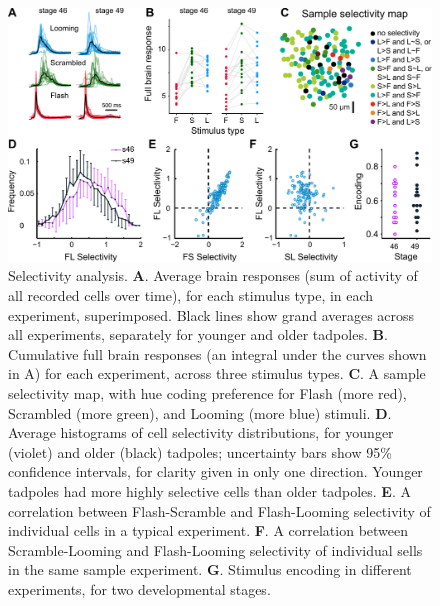\documentclass{article}
\begin{document}
\begin{figure}[t!]
\includegraphics[width=\linewidth]{fig2.pdf}
\caption{
Selectivity analysis. \textbf{A}. Average brain responses (sum of activity of all recorded cells over time), for each stimulus type, in each experiment, superimposed. Black lines show grand averages across all experiments, separately for younger and older tadpoles. \textbf{B}. Cumulative full brain responses (an integral under the curves shown in A) for each experiment, across three stimulus types. \textbf{C}. A sample selectivity map, with hue coding preference for Flash (more red), Scrambled (more green), and Looming (more blue) stimuli. \textbf{D}. Average histograms of cell selectivity distributions, for younger (violet) and older (black) tadpoles; uncertainty bars show 95\% confidence intervals, for clarity given in only one direction. Younger tadpoles had more highly selective cells than older tadpoles. \textbf{E}. A correlation between Flash-Scramble and Flash-Looming selectivity of individual cells in a typical experiment. \textbf{F}. A correlation between Scramble-Looming and Flash-Looming selectivity of individual sells in the same sample experiment. \textbf{G}. Stimulus encoding in different experiments, for two developmental stages.}
\end{figure}
\end{document}
